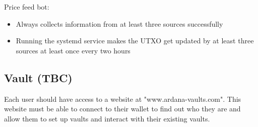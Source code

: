 \documentclass{article} %
\begin{document}
Price feed bot:
\begin{itemize}
  \item Always collects information from at least three sources successfully
  \item Running the systemd service makes the UTXO get updated by at least three
    sources at least once every two hours
\end{itemize}

% 
% 
% 
% 
\subsection{Vault (TBC)}

Each user should have access to a website at "www.ardana-vaults.com". This
website must be able to connect to their wallet to find out who they are and
allow them to set up vaults and interact with their existing vaults.
\end{document}
